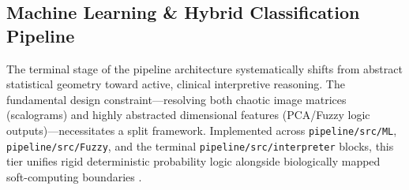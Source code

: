 \subsection{Machine Learning \& Hybrid Classification Pipeline}
\label{subsec:classification_pipeline}
The terminal stage of the pipeline architecture systematically shifts from abstract statistical geometry toward active, clinical interpretive reasoning. The fundamental design constraint—resolving both chaotic image matrices (scalograms) and highly abstracted dimensional features (PCA/Fuzzy logic outputs)—necessitates a split framework. Implemented across \texttt{pipeline/src/ML}, \texttt{pipeline/src/Fuzzy}, and the terminal \texttt{pipeline/src/interpreter} blocks, this tier unifies rigid deterministic probability logic alongside biologically mapped soft-computing boundaries \cite{jang1993anfis, oh2019deep}.

